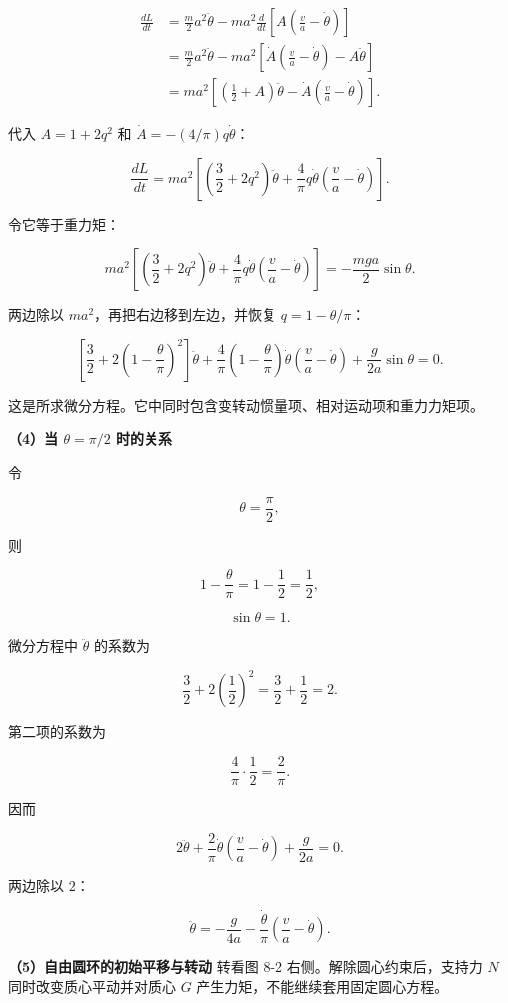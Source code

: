 \documentclass[12pt,a4paper,UTF8]{ctexart}
\begin{document}
\[\begin{aligned}
\frac{dL}{dt}
&=\frac m2a^2\ddot\theta
-ma^2\frac d{dt}
\left[A\left(\frac va-\dot\theta\right)\right]\\
&=\frac m2a^2\ddot\theta
-ma^2\left[
\dot A\left(\frac va-\dot\theta\right)
-A\ddot\theta
\right]\\
&=ma^2\left[
\left(\frac12+A\right)\ddot\theta
-\dot A\left(\frac va-\dot\theta\right)
\right].
\end{aligned}\]

代入 \(A=1+2q^2\) 和 \(\dot A=-(4/\pi)q\dot\theta\)：

\[\frac{dL}{dt}=ma^2\left[
\left(\frac32+2q^2\right)\ddot\theta
+\frac4\pi q\dot\theta
\left(\frac va-\dot\theta\right)
\right].\]

令它等于重力矩：

\[ma^2\left[
\left(\frac32+2q^2\right)\ddot\theta
+\frac4\pi q\dot\theta
\left(\frac va-\dot\theta\right)
\right]
=-\frac{mga}{2}\sin\theta.\]

两边除以 \(ma^2\)，再把右边移到左边，并恢复 \(q=1-\theta/\pi\)：

\[\boxed{
\left[\frac32+2\left(1-\frac\theta\pi\right)^2\right]\ddot\theta
+\frac4\pi\left(1-\frac\theta\pi\right)\dot\theta
\left(\frac va-\dot\theta\right)
+\frac g{2a}\sin\theta=0
}.\]

这是所求微分方程。它中同时包含变转动惯量项、相对运动项和重力力矩项。

\textbf{（4）当 \(\theta=\pi/2\) 时的关系}

令

\[\theta=\frac\pi2,\]

则

\[1-\frac\theta\pi=1-\frac12=\frac12,\]

\[\sin\theta=1.\]

微分方程中 \(\ddot\theta\) 的系数为

\[\frac32+2\left(\frac12\right)^2
=\frac32+\frac12=2.\]

第二项的系数为

\[\frac4\pi\cdot\frac12=\frac2\pi.\]

因而

\[2\ddot\theta+\frac2\pi\dot\theta
\left(\frac va-\dot\theta\right)+\frac g{2a}=0.\]

两边除以 \(2\)：

\[\boxed{
\ddot\theta
=-\frac g{4a}
-\frac{\dot\theta}{\pi}
\left(\frac va-\dot\theta\right)
}.\]

\textbf{（5）自由圆环的初始平移与转动} 转看图 8-2
右侧。解除圆心约束后，支持力 \(N\) 同时改变质心平动并对质心 \(G\)
产生力矩，不能继续套用固定圆心方程。
\end{document}
